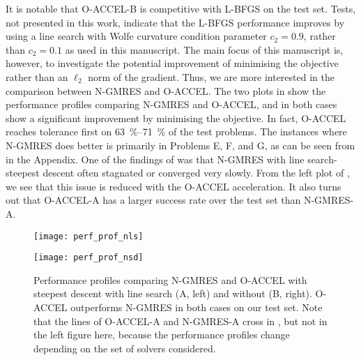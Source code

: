 \documentclass[main.tex]{subfiles}
\begin{document}
It is notable that O-ACCEL-B is competitive with L-BFGS on the test
set. Tests, not presented in this work, indicate that the L-BFGS
performance improves by using a line search with Wolfe curvature
condition parameter $c_2=0.9$, rather than $c_2=0.1$ as used in this
manuscript.  The main focus of this manuscript is, however, to
investigate the potential improvement of minimising the objective
rather than an $\ell_2$ norm of the gradient. Thus, we are more
interested in the comparison between N-GMRES and O-ACCEL.  The two
plots in  show the performance profiles
comparing N-GMRES and O-ACCEL, and in both cases show a significant
improvement by minimising the objective. In fact, O-ACCEL reaches
tolerance first on \SIrange{63}{71}{\percent} of the test problems.
The instances where N-GMRES does better is primarily in Problems E, F,
and G, as can be seen from  in the Appendix.  One of
the findings of \citet{sterck2013steepest} was that N-GMRES with line
search-steepest descent often stagnated or converged very slowly. From
the left plot of , we see that this issue
is reduced with the O-ACCEL acceleration. It also turns out that
O-ACCEL-A has a larger success rate over the test set than N-GMRES-A.
\begin{figure}[htb]
  \centering
  \begin{minipage}{0.49\textwidth}
    \texttt{[image: perf\_prof\_nls]}
  \end{minipage}
  \hfill
  \begin{minipage}{0.49\textwidth}
    \texttt{[image: perf\_prof\_nsd]}
  \end{minipage}
  \caption{Performance profiles comparing N-GMRES and O-ACCEL with
    steepest descent with line search (A, left) and without (B,
    right).  O-ACCEL outperforms N-GMRES in both cases on our test
    set.  Note that the lines of O-ACCEL-A and N-GMRES-A cross in
    , but not in the left figure here, because
    the performance profiles change depending on the set of solvers
    considered.  }\label{fig:perf_prof_nls_nsd}
\end{figure}
\end{document}
